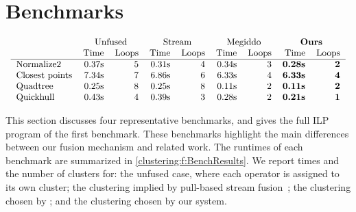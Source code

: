 \section{Benchmarks}
\label{clustering:s:Benchmarks}

\begin{table}
$$\begin{array}{c}

\begin{tabular}{lrrrrrrrr}
                & \multicolumn{2}{c}{Unfused}         & \multicolumn{2}{c}{Stream}
                & \multicolumn{2}{c}{Megiddo} &\multicolumn{2}{c}{\textbf{Ours}} \\
                & Time & Loops   & Time & Loops      & Time & Loops & Time & Loops   \\
\hline
Normalize2      & 0.37s & 5      & 0.31s & 4          & 0.34s & 3  & \textbf{0.28s} & \textbf{2}\\
Closest points  & 7.34s & 7      & 6.86s & 6          & 6.33s & 4  & \textbf{6.33s} & \textbf{4}\\
Quadtree        & 0.25s & 8      & 0.25s & 8          & 0.11s & 2  & \textbf{0.11s} & \textbf{2}\\
Quickhull       & 0.43s & 4      & 0.39s & 3          & 0.28s & 2  & \textbf{0.21s} & \textbf{1}\\
\end{tabular}

\end{array}$$
\caption{Benchmark results}
\label{clustering:f:BenchResults}
\end{table}

This section discusses four representative benchmarks, and gives the full ILP program of the first benchmark.
These benchmarks highlight the main differences between our fusion mechanism and related work.
The runtimes of each benchmark are summarized in \cref{clustering:f:BenchResults}.
We report times and the number of clusters for: the unfused case, where each operator is assigned to its own cluster; the clustering implied by pull-based stream fusion~\cite{coutts2007stream}; the clustering chosen by \citet{megiddo1998optimal}; and the clustering chosen by our system. 

